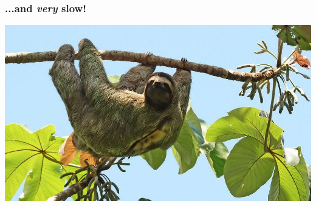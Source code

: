 \documentclass[aspectratio=169,x11names]{beamer}
\begin{document}
\begin{frame}
\frametitle{...and \emph{very} slow!}
\begin{center}
\includegraphics[height=0.75\textheight, keepaspectratio]{images/sloth}
\end{center}
\end{frame}
\end{document}
